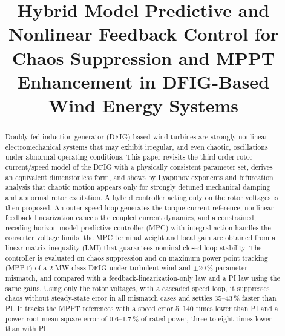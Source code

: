 \documentclass[conference]{IEEEtran}
\begin{document}
\title{Hybrid Model Predictive and Nonlinear Feedback Control for Chaos Suppression and MPPT Enhancement in DFIG-Based Wind Energy Systems}

\author{
\and
{}
\and
{}
}

\maketitle

\begin{abstract}
Doubly fed induction generator (DFIG)-based wind turbines are strongly nonlinear electromechanical systems that may exhibit irregular, and even chaotic, oscillations under abnormal operating conditions. This paper revisits the third-order rotor-current/speed model of the DFIG with a physically consistent parameter set, derives an equivalent dimensionless form, and shows by Lyapunov exponents and bifurcation analysis that chaotic motion appears only for strongly detuned mechanical damping and abnormal rotor excitation. A hybrid controller acting only on the rotor voltages is then proposed. An outer speed loop generates the torque-current reference, nonlinear feedback linearization cancels the coupled current dynamics, and a constrained, receding-horizon model predictive controller (MPC) with integral action handles the converter voltage limits; the MPC terminal weight and local gain are obtained from a linear matrix inequality (LMI) that guarantees nominal closed-loop stability. The controller is evaluated on chaos suppression and on maximum power point tracking (MPPT) of a 2-MW-class DFIG under turbulent wind and $\pm 20\,\%$ parameter mismatch, and compared with a feedback-linearization-only law and a PI law using the same gains. Using only the rotor voltages, with a cascaded speed loop, it suppresses chaos without steady-state error in all mismatch cases and settles 35--43\,\% faster than PI. It tracks the MPPT references with a speed error 5--140 times lower than PI and a power root-mean-square error of 0.6--1.7\,\% of rated power, three to eight times lower than with PI.
\end{abstract}
\end{document}
